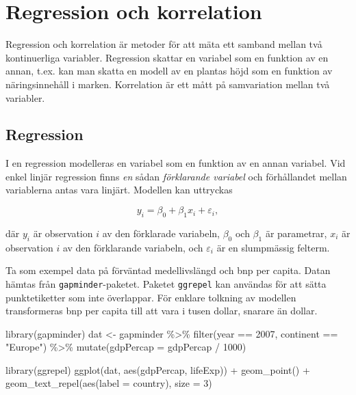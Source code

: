 \documentclass[
]{book}
\newenvironment{Shaded}{\begin{snugshade}}{\end{snugshade}}
\newcommand{\AttributeTok}[1]{\textcolor[rgb]{0.77,0.63,0.00}{#1}}
\newcommand{\DecValTok}[1]{\textcolor[rgb]{0.00,0.00,0.81}{#1}}
\newcommand{\FunctionTok}[1]{\textcolor[rgb]{0.00,0.00,0.00}{#1}}
\newcommand{\NormalTok}[1]{#1}
\newcommand{\OtherTok}[1]{\textcolor[rgb]{0.56,0.35,0.01}{#1}}
\newcommand{\SpecialCharTok}[1]{\textcolor[rgb]{0.00,0.00,0.00}{#1}}
\newcommand{\StringTok}[1]{\textcolor[rgb]{0.31,0.60,0.02}{#1}}
\theoremstyle{definition}
\theoremstyle{definition}
\theoremstyle{definition}
\theoremstyle{definition}
\theoremstyle{remark}
\begin{document}
\hypertarget{regression-och-korrelation}{%
\chapter{Regression och korrelation}\label{regression-och-korrelation}}

Regression och korrelation är metoder för att mäta ett samband mellan två kontinuerliga variabler. Regression skattar en variabel som en funktion av en annan, t.ex. kan man skatta en modell av en plantas höjd som en funktion av näringsinnehåll i marken. Korrelation är ett mått på samvariation mellan två variabler.

\hypertarget{regression}{%
\section{Regression}\label{regression}}

I en regression modelleras en variabel som en funktion av en annan variabel. Vid enkel linjär regression finns \emph{en} sådan \emph{förklarande variabel} och förhållandet mellan variablerna antas vara linjärt. Modellen kan uttryckas

\[y_{i} = \beta_0 + \beta_1 x_i + \varepsilon_i,\]

där \(y_i\) är observation \(i\) av den förklarade variabeln, \(\beta_0\) och \(\beta_1\) är parametrar, \(x_i\) är observation \(i\) av den förklarande variabeln, och \(\varepsilon_i\) är en slumpmässig felterm.

Ta som exempel data på förväntad medellivslängd och bnp per capita. Datan hämtas från \texttt{gapminder}-paketet. Paketet \texttt{ggrepel} kan användas för att sätta punktetiketter som inte överlappar. För enklare tolkning av modellen transformeras bnp per capita till att vara i tusen dollar, snarare än dollar.

\begin{Shaded}
\begin{Highlighting}[]
\FunctionTok{library}\NormalTok{(gapminder)}
\NormalTok{dat }\OtherTok{\textless{}{-}}\NormalTok{ gapminder }\SpecialCharTok{\%\textgreater{}\%} 
  \FunctionTok{filter}\NormalTok{(year }\SpecialCharTok{==} \DecValTok{2007}\NormalTok{, continent }\SpecialCharTok{==} \StringTok{"Europe"}\NormalTok{) }\SpecialCharTok{\%\textgreater{}\%} 
  \FunctionTok{mutate}\NormalTok{(}\AttributeTok{gdpPercap =}\NormalTok{ gdpPercap }\SpecialCharTok{/} \DecValTok{1000}\NormalTok{)}

\FunctionTok{library}\NormalTok{(ggrepel)}
\FunctionTok{ggplot}\NormalTok{(dat, }\FunctionTok{aes}\NormalTok{(gdpPercap, lifeExp)) }\SpecialCharTok{+}
  \FunctionTok{geom\_point}\NormalTok{() }\SpecialCharTok{+}
  \FunctionTok{geom\_text\_repel}\NormalTok{(}\FunctionTok{aes}\NormalTok{(}\AttributeTok{label =}\NormalTok{ country), }\AttributeTok{size =} \DecValTok{3}\NormalTok{)}
\end{Highlighting}
\end{Shaded}
\end{document}
